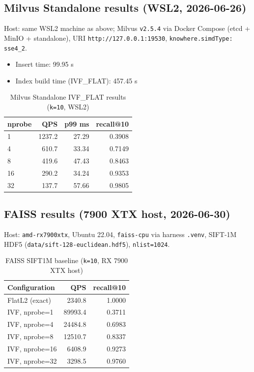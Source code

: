 \documentclass[11pt,a4paper]{article}
\begin{document}
\subsection{Milvus Standalone results (WSL2, 2026-06-26)}

Host: same WSL2 machine as above; Milvus \texttt{v2.5.4} via Docker Compose
(etcd + MinIO + standalone), URI \texttt{http://127.0.0.1:19530},
\texttt{knowhere.simdType: sse4\_2}.

\begin{itemize}[leftmargin=*]
  \item Insert time: 99.95 s
  \item Index build time (IVF\_FLAT): 457.45 s
\end{itemize}

\begin{table}[h]
\centering
\caption{Milvus Standalone IVF\_FLAT results (\texttt{k=10}, WSL2)}
\begin{tabular}{@{}lrrr@{}}
\toprule
\textbf{nprobe} & \textbf{QPS} & \textbf{p99 ms} & \textbf{recall@10} \\
\midrule
1  & 1237.2 &  27.29 & 0.3908 \\
4  &  610.7 &  33.34 & 0.7149 \\
8  &  419.6 &  47.43 & 0.8463 \\
16 &  290.2 &  34.24 & 0.9353 \\
32 &  137.7 &  57.66 & 0.9805 \\
\bottomrule
\end{tabular}
\end{table}

\subsection{FAISS results (7900 XTX host, 2026-06-30)}

Host: \texttt{amd-rx7900xtx}, Ubuntu 22.04, \texttt{faiss-cpu} via harness \texttt{.venv},
SIFT-1M HDF5 (\texttt{data/sift-128-euclidean.hdf5}), \texttt{nlist=1024}.

\begin{table}[h]
\centering
\caption{FAISS SIFT1M baseline (\texttt{k=10}, RX 7900 XTX host)}
\begin{tabular}{@{}lrr@{}}
\toprule
\textbf{Configuration} & \textbf{QPS} & \textbf{recall@10} \\
\midrule
FlatL2 (exact)   & 2340.8  & 1.0000 \\
IVF, nprobe=1    & 89993.4 & 0.3711 \\
IVF, nprobe=4    & 24484.8 & 0.6983 \\
IVF, nprobe=8    & 12510.7 & 0.8337 \\
IVF, nprobe=16   &  6408.9 & 0.9273 \\
IVF, nprobe=32   &  3298.5 & 0.9760 \\
\bottomrule
\end{tabular}
\end{table}
\end{document}
